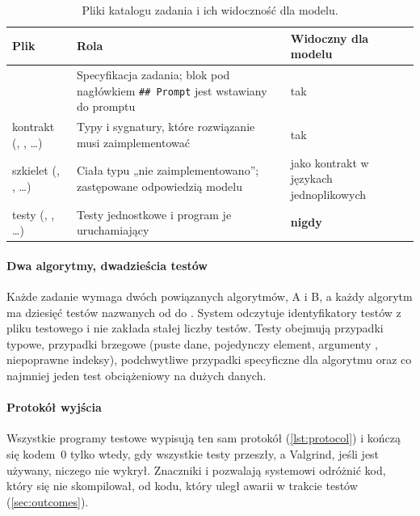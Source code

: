 \begin{table}[htbp]
  \centering
  \caption{Pliki katalogu zadania i ich widoczność dla modelu.}
  \label{tab:task-files}
  \small
  \begin{tabularx}{\textwidth}{@{}lYl@{}}
    \toprule
    Plik & Rola & Widoczny dla modelu \\
    \midrule
                & Specyfikacja zadania; blok pod nagłówkiem \texttt{\#\# Prompt} jest wstawiany do promptu & tak \\
    kontrakt (, , \ldots) & Typy i sygnatury, które rozwiązanie musi zaimplementować & tak \\
    szkielet (, , \ldots) & Ciała typu „nie zaimplementowano”; zastępowane odpowiedzią modelu & jako kontrakt w językach jednoplikowych \\
    testy (, , \ldots) & Testy jednostkowe i program je uruchamiający & \textbf{nigdy} \\
    \bottomrule
  \end{tabularx}
\end{table}

\paragraph{Dwa algorytmy, dwadzieścia testów} Każde zadanie wymaga dwóch powiązanych algorytmów,
A i B, a każdy algorytm ma dziesięć testów nazwanych od  do
. System odczytuje identyfikatory testów z pliku testowego i nie zakłada
stałej liczby testów. Testy obejmują przypadki typowe, przypadki brzegowe (puste dane, pojedynczy
element, argumenty , niepoprawne indeksy), podchwytliwe przypadki specyficzne dla
algorytmu oraz co najmniej jeden test obciążeniowy na dużych danych.

\paragraph{Protokół wyjścia} Wszystkie programy testowe wypisują ten sam protokół
(\cref{lst:protocol}) i kończą się kodem~0 tylko wtedy, gdy wszystkie testy przeszły, a Valgrind,
jeśli jest używany, niczego nie wykrył. Znaczniki  i
 pozwalają systemowi odróżnić kod, który się nie skompilował, od
kodu, który uległ awarii w trakcie testów (\cref{sec:outcomes}).

